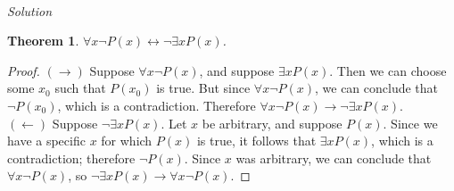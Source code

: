 \documentclass{report}
\newtheorem*{theorem}{Theorem}
\theoremstyle{definition}
\begin{document}
\vspace{1mm}\\
\textit{Solution}
\begin{theorem}
$\forall x\neg P(x)\leftrightarrow\neg\exists xP(x)$.
\end{theorem}
\begin{proof}
$(\to)$ Suppose $\forall x\neg P(x)$, and suppose $\exists xP(x)$. Then we can choose some $x_0$ such that $P(x_0)$ is true. But since $\forall x\neg P(x)$, we can conclude that $\neg P(x_0)$, which
is a contradiction. Therefore $\forall x\neg P(x)\to\neg\exists xP(x)$.\\
\indent$(\leftarrow)$ Suppose $\neg\exists xP(x)$. Let $x$ be arbitrary, and suppose $P(x)$. Since we have a specific $x$ for which $P(x)$ is true, it follows that $\exists xP(x)$, which is a
contradiction; therefore $\neg P(x)$. Since $x$ was arbitrary, we can conclude that $\forall x\neg P(x)$, so $\neg\exists xP(x)\to\forall x\neg P(x)$.
\end{proof}
\newpage
\end{document}
